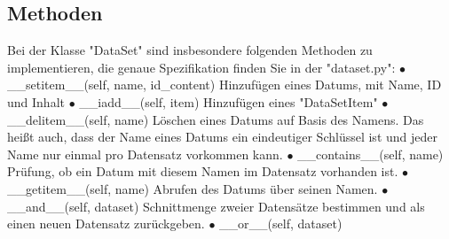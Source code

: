 \documentclass[]{article}
\begin{document}
\subsection{Methoden}
Bei der Klasse "DataSet" sind insbesondere folgenden Methoden zu implementieren, die genaue Spezifikation finden Sie in der "dataset.py":
\newline
\newline
$\bullet$ \_\_setitem\_\_(self, name, id\_content)
\newline
\hspace*{1cm} Hinzufügen eines Datums, mit Name, ID und Inhalt
\newline
\newline
$\bullet$ \_\_iadd\_\_(self, item)
\newline
\hspace*{1cm} Hinzufügen eines "DataSetItem"
\newline
\newline
$\bullet$ \_\_delitem\_\_(self, name)
\newline
\hspace*{1cm} Löschen eines Datums auf Basis des Namens.
\newline
\hspace*{1cm}Das heißt auch, dass der Name eines Datums ein eindeutiger Schlüssel ist \hspace*{1cm}und jeder Name nur einmal pro Datensatz vorkommen kann.
\newline
\newline
$\bullet$ \_\_contains\_\_(self, name)
\newline
\hspace*{1cm} Prüfung, ob ein Datum mit diesem Namen im Datensatz vorhanden ist.
\newline
\newline
$\bullet$ \_\_getitem\_\_(self, name)
\newline
\hspace*{1cm} Abrufen des Datums über seinen Namen.
\newline
\newline
$\bullet$ \_\_and\_\_(self, dataset)
\newline
\hspace*{1cm} Schnittmenge zweier Datensätze bestimmen und als einen neuen \newline\hspace*{1cm}Datensatz zurückgeben.
\newline
\newline
$\bullet$ \_\_or\_\_(self, dataset)
\newline
\end{document}

